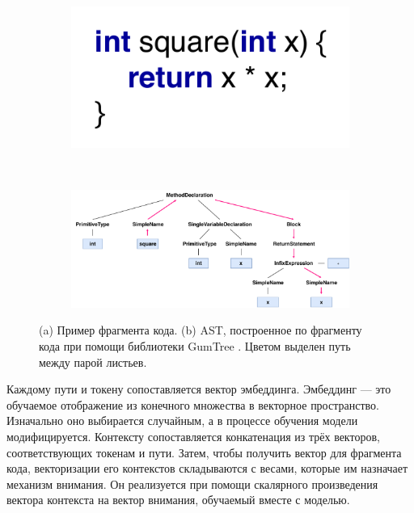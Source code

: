 \begin{figure}[ht]
    \centering
       \begin{subfigure}{0.35\linewidth}
       \centering
       \includegraphics[width=\linewidth]{images/AstCode.pdf}
       \caption{}
       \label{fig:ast-code} 
    \end{subfigure}
    \\[\baselineskip]
    \begin{subfigure}{0.98\linewidth}
       \centering
       \includegraphics[width=\linewidth]{images/AstExample.pdf}
       \caption{}
       \label{fig:ast-example}
    \end{subfigure}
    \centering
    \caption{(a) Пример фрагмента кода. (b) AST, построенное по фрагменту кода при помощи библиотеки GumTree \cite{GumTree}. Цветом выделен путь между парой листьев.}
    \end{figure}

Каждому пути и токену сопоставляется вектор эмбеддинга. Эмбеддинг — это обучаемое отображение из конечного множества в векторное пространство. Изначально оно выбирается случайным, а в процессе обучения модели модифицируется. Контексту сопоставляется конкатенация из трёх векторов, соответствующих токенам и пути. Затем, чтобы получить вектор для фрагмента кода, векторизации его контекстов складываются с весами, которые им назначает механизм внимания. Он реализуется при помощи скалярного произведения вектора контекста на вектор внимания, обучаемый вместе с моделью.

